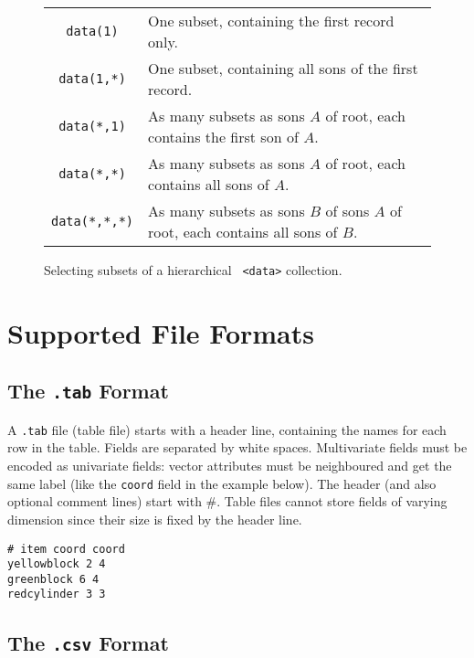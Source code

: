 \documentclass[a4paper]{book}
\begin{document}
\begin{figure}[htb]
\begin{center}\begin{tabular}{|c|p{11cm}|}
\hline
{\tt data(1)} & One subset, containing the first record only. \\
{\tt data(1,*)} & One subset, containing all sons of the first
record.\\
{\tt data(*,1)} & As many subsets as sons $A$ of root, each contains
the first son of $A$. \\
{\tt data(*,*)} & As many subsets as sons $A$ of root, each contains all
sons of $A$.\\
{\tt data(*,*,*)} & As many subsets as sons $B$ of sons $A$ of root, each
contains all sons of $B$.\\
\hline
\end{tabular}
\caption{\label{hcmd:fig}Selecting subsets of a hierarchical {\tt
<data>} collection.}
\end{center}\end{figure}



\section{Supported File Formats}\label{fileformat:sec}

\subsection{The {\tt .tab} Format}

A {\tt .tab} file (table file) starts with a header line, containing
the names for each row in the table. Fields are separated by white
spaces. Multivariate fields must be encoded as univariate fields:
vector attributes must be neighboured and get the same label (like the
{\tt coord} field in the example below). The header (and also optional
comment lines) start with \#.  Table files cannot store fields of
varying dimension since their size is fixed by the header line.

\begin{verbatim}
# item coord coord
yellowblock 2 4
greenblock 6 4
redcylinder 3 3
\end{verbatim}

\subsection{The {\tt .csv} Format}
\end{document}
